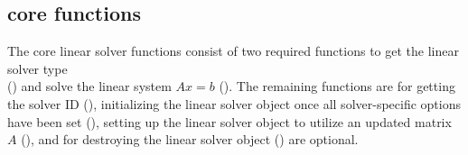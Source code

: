 \subsection{ core functions}\label{ss:sunlinsol_CoreFn}

The core linear solver functions consist of two required functions to get the
linear solver type \\ \noindent () and solve the linear
system $Ax=b$ (). The remaining functions are for getting the
solver ID (), initializing the linear solver object once all
solver-specific options have been set (), setting up the
linear solver object to utilize an updated matrix $A$ (), and
for destroying the linear solver object () are optional.

